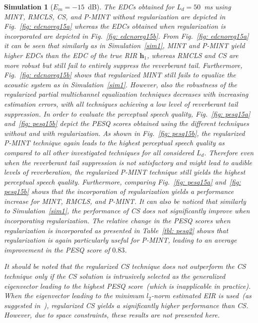 \documentclass[10pt]{IEEEtran}
\newtheorem{simulation}{Simulation}
\begin{document}
\begin{simulation}[$E_m=-15$~dB]
The EDCs obtained for $L_d = 50$~ms using MINT, RMCLS, CS, and P-MINT without regularization are depicted in Fig.~\ref{fig: edcnoreg15a} whereas the EDCs obtained when regularization is incorporated are depicted in Fig.~\ref{fig: edcnoreg15b}.
From Fig.~\ref{fig: edcnoreg15a} it can be seen that similarly as in Simulation~\ref{sim1}, MINT and P-MINT yield higher EDCs than the EDC of the true RIR $\mathbf{h}_1$, whereas RMCLS and CS are more robust but still fail to entirely suppress the reverberant tail.
Furthermore, Fig.~\ref{fig: edcnoreg15b} shows that regularized MINT still fails to equalize the acoustic system as in Simulation~\ref{sim1}.
However, also the robustness of the regularized partial multichannel equalization techniques decreases with increasing estimation errors, with all techniques achieving a low level of reverberant tail suppression.
In order to evaluate the perceptual speech quality, Fig.~\ref{fig: pesq15a} and~\ref{fig: pesq15b} depict the PESQ scores obtained using the different techniques without and with regularization.
As shown in Fig.~\ref{fig: pesq15b}, the regularized P-MINT technique again leads to the highest perceptual speech quality as compared to all other investigated techniques for all considered $L_d$. Therefore even when the reverberant tail suppression is not satisfactory and might lead to audible levels of reverberation, the regularized P-MINT technique still yields the highest perceptual speech quality. 
Furthermore, comparing Fig.~\ref{fig: pesq15a} and~\ref{fig: pesq15b} shows that the incorporation of regularization yields a performance increase for MINT, RMCLS, and P-MINT.
It can also be noticed that similarly to Simulation~\ref{sim1}, the performance of CS does not significantly improve when incorporating regularization.
The relative change in the PESQ scores when regularization is incorporated as presented in Table~\ref{tbl: pesq2} shows that regularization is again particularly useful for P-MINT, leading to an average improvement in the PESQ score of $0.83$.

It should be noted that the regularized CS technique does not outperform the CS technique only if the CS solution is intrusively selected as the generalized eigenvector leading to the highest PESQ score~(which is inapplicable in practice). When the eigenvector leading to the minimum $l_2$-norm estimated EIR is used~(as suggested in~\cite{Zhang_IWAENC_2010}), regularized CS yields a significantly higher performance than CS. However, due to space constraints, these results are not presented here.
\end{simulation}
\end{document}
